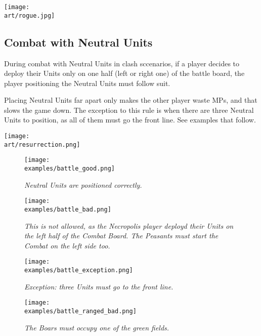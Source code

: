 \begin{multicols}{2}
\texttt{[image: \\art/rogue.jpg]}

\subsection*{Combat with Neutral Units}

During combat with Neutral Units in clash sccenarios, if a player decides to deploy their Units only on one half (left or right one) of the battle board, the player positioning the Neutral Units must follow suit.

Placing Neutral Units far apart only makes the other player waste MPs, and that slows the game down.
The exception to this rule is when there are three Neutral  Units to position, as all of them must go the front line.
See examples that follow.

\begin{center}
  \texttt{[image: \\art/resurrection.png]}
\end{center}

\end{multicols}

\begin{figure*}[!h]
  \mbox{}%
  \hfill%
  \begin{minipage}[t]{0.44\textwidth}
    \centering
    \texttt{[image: \\examples/battle\_good.png]}
    \caption[good protected]{\textit{Neutral Units are positioned correctly.}}
  \end{minipage}
  \hfill%
  \begin{minipage}[t]{0.44\textwidth}
    \centering
    \texttt{[image: \\examples/battle\_bad.png]}
    \caption[bad protected]{\textit{This is not allowed, as the Necropolis player deployd their Units on the left half of the Combat Board.
      The Peasants must start the Combat on the left side too.}}
  \end{minipage}
  \hfill%
  \mbox{}%
\end{figure*}

\clearpage

\begin{figure*}[!h]
  \mbox{}%
  \hfill%
  \begin{minipage}[t]{0.44\textwidth}
    \centering
    \texttt{[image: \\examples/battle\_exception.png]}
    \caption[exception protected]{\textit{Exception: three  Units must go to the front line.}}
  \end{minipage}
  \hfill%
  \begin{minipage}[t]{0.44\textwidth}
    \centering
    \texttt{[image: \\examples/battle\_ranged\_bad.png]}
    \caption[ranged protected]{\textit{The Boars must occupy one of the green fields.}}
  \end{minipage}
  \hfill%
  \mbox{}%
\end{figure*}

